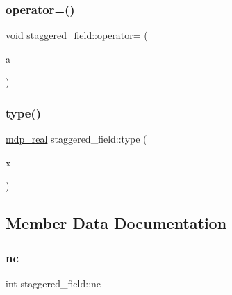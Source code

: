 \mbox{\label{classstaggered__field_ac3fee1898eaa4198744c5bc0cc969e2e}} 
\subsubsection{\texorpdfstring{operator=()}{operator=()}\hspace{0.1cm}{\footnotesize\ttfamily [2/2]}}
{\footnotesize\ttfamily void staggered\+\_\+field\+::operator= (\begin{DoxyParamCaption}\item[{\hyperlink{classmdp__complex}{mdp\+\_\+complex}}]{a }\end{DoxyParamCaption})\hspace{0.3cm}{\ttfamily [inline]}}

\mbox{\label{classstaggered__field_a5e53f3e9e5c268dde3e3f2eb9e64befa}} 
\subsubsection{\texorpdfstring{type()}{type()}}
{\footnotesize\ttfamily \hyperlink{mdp__global__vars_8h_a69d96b74c791e0bbdb888b3913a69450}{mdp\+\_\+real} staggered\+\_\+field\+::type (\begin{DoxyParamCaption}\item[{\hyperlink{mdp__compatibility__macros_8h_aa6f1179c424e48adef1cedf7c436eb75}{site}}]{x }\end{DoxyParamCaption})\hspace{0.3cm}{\ttfamily [inline]}}



\subsection{Member Data Documentation}
\mbox{\label{classstaggered__field_a4ac408eebebb6b76ac209479df87459a}} 
\subsubsection{\texorpdfstring{nc}{nc}}
{\footnotesize\ttfamily int staggered\+\_\+field\+::nc}

